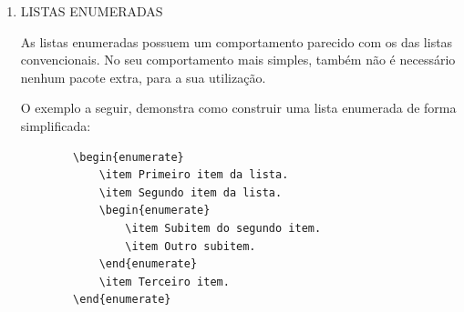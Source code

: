 \begin{enumerate}
	Também é possível criar sub hierarquia de listas, simplemente criando novos blocos do comando \verb|\begin{itemize}|, dentro de um já existente.

	\begin{verbatim}
	\begin{itemize}
		\item Primeiro item da lista não numerada.
		\item Segundo item, que pode ter um subitem:
		\begin{itemize}
			\item Subitem não numerado.
			\item Outro subitem.
		\end{itemize}
		\item Terceiro item.
	\end{itemize}
	\end{verbatim}

	O resultado final é apresentado a seguir:

	\begin{itemize}
		\item Primeiro item da lista não numerada.
		\item Segundo item, que pode ter um subitem:
		\begin{itemize}
			\item Subitem não numerado.
			\item Outro subitem.
		\end{itemize}
		\item Terceiro item.
	\end{itemize}

	\item \MakeUppercase{Listas Enumeradas}

	As listas enumeradas possuem um comportamento parecido com os das listas convencionais. No seu comportamento mais simples, também não é necessário nenhum pacote extra, para a sua utilização.

	O exemplo a seguir, demonstra como construir uma lista enumerada de forma simplificada:

	\begin{verbatim}
		\begin{enumerate}
			\item Primeiro item da lista.
			\item Segundo item da lista.
			\begin{enumerate}
				\item Subitem do segundo item.
				\item Outro subitem.
			\end{enumerate}
			\item Terceiro item.
		\end{enumerate}
	\end{verbatim}


\end{enumerate}
